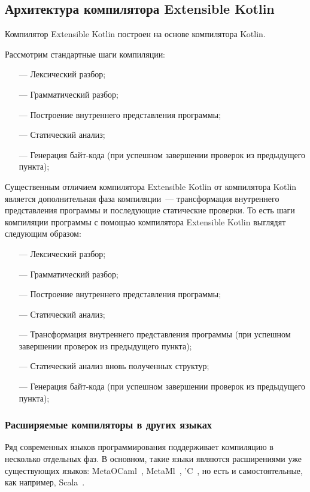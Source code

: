 \subsection{Архитектура компилятора Extensible Kotlin}\label{architecture}
Компилятор Extensible Kotlin построен на основе компилятора Kotlin.

Рассмотрим стандартные шаги компиляции:
\begin{itemize}
\item[---] Лексический разбор;
\item[---] Грамматический разбор;
\item[---] Построение внутреннего представления программы;
\item[---] Статический анализ; \td
\item[---] Генерация байт-кода (при успешном завершении проверок из предыдущего пункта);
\end{itemize}

Существенным отличием компилятора Extensible Kotlin от компилятора Kotlin является дополнительная фаза компиляции~--- трансформация внутреннего представления программы  и последующие статические проверки. То есть шаги компиляции программы с помощью компилятора Extensible Kotlin выглядят следующим образом:
\begin{itemize}
\item[---] Лексический разбор;
\item[---] Грамматический разбор;
\item[---] Построение внутреннего представления программы;
\item[---] Статический анализ; \td
\item[---] Трансформация внутреннего представления программы (при успешном завершении проверок из предыдущего пункта);
\item[---] Статический анализ вновь полученных структур; \td
\item[---] Генерация байт-кода (при успешном завершении проверок из предыдущего пункта);
\end{itemize}

\subsubsection{Расширяемые компиляторы в других языках} %
Ряд современных языков программирования поддерживает компиляцию в несколько отдельных фаз.
В основном, такие языки являются расширениями уже существующих языков: MetaOCaml~\cite{metaocaml}, MetaMl~\cite{metaml}, 'C~\cite{extendible-c}, но есть и самостоятельные, как например, Scala~\cite{scala-spec}. 

